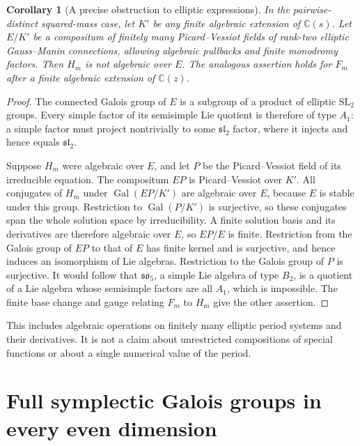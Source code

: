 \documentclass[11pt,a4paper]{article}
\newtheorem{corollary}[theorem]{Corollary}
\theoremstyle{definition}
\theoremstyle{remark}
\numberwithin{equation}{section}
\begin{document}
\begin{corollary}[A precise obstruction to elliptic expressions]
\label{p6:fs:noelliptic}
In the pairwise-distinct squared-mass case, let $K'$ be any finite
algebraic extension of $\mathbb C(s)$. Let $E/K'$ be a compositum
of finitely many Picard--Vessiot fields of rank-two elliptic
Gauss--Manin connections, allowing algebraic pullbacks and finite
monodromy factors. Then $H_m$ is not algebraic over $E$.
The analogous assertion holds for $F_m$ after a finite algebraic
extension of $\mathbb C(z)$.
\end{corollary}
\begin{proof}
The connected Galois group of $E$ is a subgroup of a product of
elliptic $\mathrm{SL}_2$ groups. Every simple factor of its
semisimple Lie quotient is therefore of type $A_1$: a simple
factor must project nontrivially to some $\mathfrak{sl}_2$ factor,
where it injects and hence equals $\mathfrak{sl}_2$.

Suppose $H_m$ were algebraic over $E$, and let $P$ be the
Picard--Vessiot field of its irreducible equation. The compositum
$EP$ is Picard--Vessiot over $K'$. All conjugates of $H_m$ under
$\operatorname{Gal}(EP/K')$ are algebraic over $E$, because $E$
is stable under this group. Restriction to
$\operatorname{Gal}(P/K')$ is surjective, so these conjugates
span the whole solution space by irreducibility. A finite solution basis and its derivatives are
therefore algebraic over $E$, so $EP/E$ is finite. Restriction
from the Galois group of $EP$ to that of $E$ has finite kernel
and is surjective, and hence induces an isomorphism of Lie
algebras. Restriction to the Galois group of $P$ is surjective.
It would follow that $\mathfrak{so}_5$, a simple Lie algebra of
type $B_2$, is a quotient of a Lie algebra whose semisimple
factors are all $A_1$, which is impossible. The finite base change
and gauge relating $F_m$ to $H_m$ give the other assertion.
\end{proof}

This includes algebraic operations on finitely many elliptic
period systems and their derivatives. It is not a claim about
unrestricted compositions of special functions or about a single
numerical value of the period.


\clearpage

\section{Full symplectic Galois groups in every even dimension}
\label{p6:fe:sec}
\end{document}
